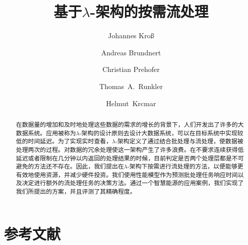 \documentclass{llncs}
\begin{document}
\pagestyle{headings}

\mainmatter              %
%
\title{基于$\lambda$-架构的按需流处理}
%
%
\author{Johannes Kro{\ss}\Envelope
    \and Andreas Brundnert
    \and Christian Prehofer 
    \and Thomas~A.~Runkler
    \and Helmut~Krcmar
}
%
%
%

\maketitle              %

\begin{abstract}
在数据量的增加和及时地处理这些数据的需求的增长的背景下，人们开发出了许多的大数据系统。应用被称为$\lambda$-架构的设计原则去设计大数据系统，可以在目标系统中实现较低的时间延迟。为了实现实时查看，$\lambda$-架构定义了通过结合批处理与流处理，使数据被处理两次的过程。对数据的冗余处理使这一架构产生了许多浪费。在不要求连续获得低延迟或者限制在几分钟以内返回的处理结果的时候，目前判定是否两个处理层都是不可避免的方法还不存在。因此，我们提出在$\lambda$-架构下按需进行流处理的方法，以便能够更有效地使用资源，并减少硬件投资。我们使用性能模型作为预测批处理任务响应时间以及决定进行额外的流处理任务的决策方法。通过一个智慧能源的应用案例，我们实现了我们所提出的方案，并且评测了其精确程度。
\end{abstract}


\section*{参考文献}

\printbibliography[heading=none]




\cleardoublepage

\begin{refsection}

\printbibliography[heading=none]
\end{refsection}
\end{document}
